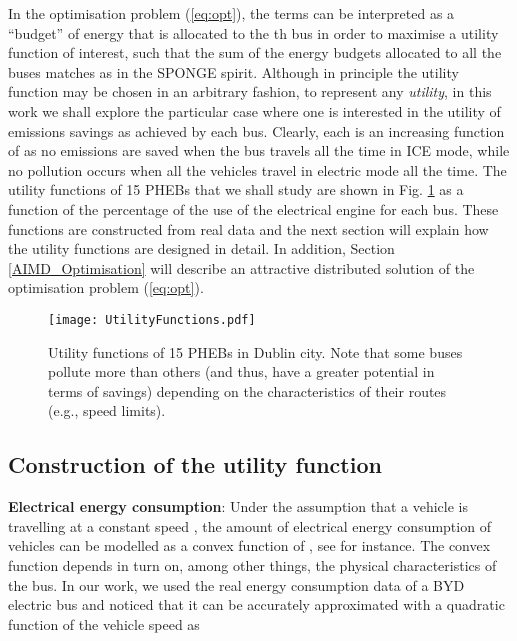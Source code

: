 \documentclass[journal]{IEEEtran}
\begin{document}
In the optimisation problem (\ref{eq:opt}), the terms  can be interpreted as a ``budget'' of energy that is allocated to the th bus in order to maximise a utility function of interest, such that the sum of the energy budgets allocated to all the buses matches  as in the SPONGE spirit. Although in principle the utility function  may be chosen in an arbitrary fashion, to represent any {\em utility}, in this work we shall explore the particular case where one is interested in the utility of  emissions savings  as achieved by each bus. Clearly, each  is an increasing function of  as no  emissions are saved when the bus travels all the time in ICE mode, while no pollution occurs when all the vehicles travel in electric mode all the time. The utility functions of 15 PHEBs that we shall study are shown in Fig. \ref{UtilityFunctions} as a function of the percentage of the use of the electrical engine for each bus. These functions are constructed from real data and the next section will explain how the utility functions are designed in detail. In addition, Section \ref{AIMD_Optimisation} will describe an attractive distributed solution of the optimisation problem (\ref{eq:opt}).
\begin{figure}[htbp]
	\begin{center}
		{\texttt{[image: UtilityFunctions.pdf]}}
		\caption{Utility functions of 15 PHEBs in Dublin city. Note that some buses pollute more than others (and thus, have a greater potential in terms of  savings) depending on the characteristics of their routes (e.g., speed limits).}
		\label{UtilityFunctions}
	\end{center}
\end{figure}


\subsection{Construction of the utility function}
\label{Utility_Functions}
\textbf{Electrical energy consumption}:
Under the assumption that a vehicle is travelling at a constant speed , the amount of electrical energy consumption of vehicles can be modelled as a convex function of , see \cite{vanHaaren,energyconsumption} for instance. The convex function depends in turn on, among other things, the physical characteristics of the bus. In our work, we used the real energy consumption data of a BYD electric bus \cite{energyconsumption} and noticed that it can be accurately approximated with a quadratic function of the vehicle speed  as
\end{document}
